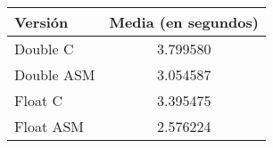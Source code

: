 \begin{center}
    \begin{tabular}{| l | c |}
                \hline
    Versión & Media (en segundos) \\
                \hline
    Double C & 3.799580 \\
    Double ASM & 3.054587 \\
    Float C & 3.395475 \\
    Float ASM  & 2.576224 \\
                \hline
            
        \end{tabular}
\end{center}
